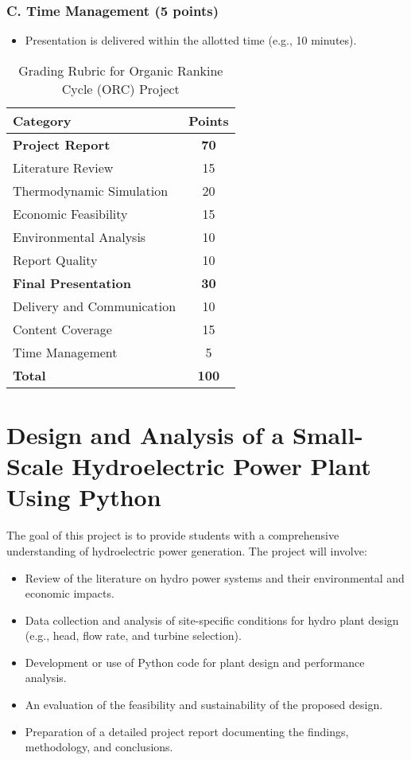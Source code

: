 \documentclass[11pt]{article}
\begin{document}
\subsubsection*{C. Time Management (5 points)}
\begin{itemize}
    \item Presentation is delivered within the allotted time (e.g., 10 minutes).
\end{itemize}
\begin{table}[h!]
    \centering
    \begin{tabular}{|l|c|}
        \hline
        \textbf{Category} & \textbf{Points} \\
        \hline
        \textbf{Project Report} & \textbf{70} \\
        Literature Review & 15 \\
        Thermodynamic Simulation & 20 \\
        Economic Feasibility & 15 \\
        Environmental Analysis & 10 \\
        Report Quality & 10 \\
        \hline
        \textbf{Final Presentation} & \textbf{30} \\
        Delivery and Communication & 10 \\
        Content Coverage & 15 \\
        Time Management & 5 \\
        \hline
        \textbf{Total} & \textbf{100} \\
        \hline
    \end{tabular}
    \caption{Grading Rubric for Organic Rankine Cycle (ORC) Project}
\end{table}

\newpage


\section{Design and Analysis of a Small-Scale Hydroelectric Power Plant Using Python}
The goal of this project is to provide students with a comprehensive understanding of hydroelectric power generation. The project will involve:
\begin{itemize}
    \item Review of the literature on hydro power systems and their environmental and economic impacts.
    \item Data collection and analysis of site-specific conditions for hydro plant design (e.g., head, flow rate, and turbine selection).
    \item Development or use of Python code for plant design and performance analysis.
    \item An evaluation of the feasibility and sustainability of the proposed design.
    \item Preparation of a detailed project report documenting the findings, methodology, and conclusions.
\end{itemize}
\end{document}
